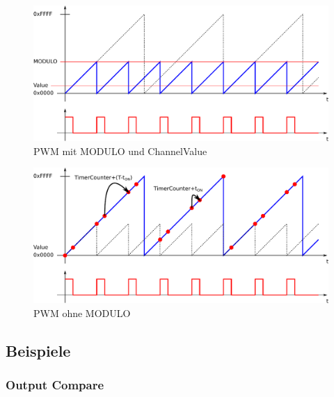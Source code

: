 \begin{figure}[h!]
	\centering
	\includegraphics[width=1\textwidth]{../fig/pwm_01.pdf}
	\caption{PWM mit MODULO und ChannelValue}
\end{figure}

\begin{figure}[h!]
	\centering
	\includegraphics[width=1\textwidth]{../fig/pwm_02.pdf}
	\caption{PWM ohne MODULO}
\end{figure}

\newpage
\subsection{Beispiele}

\subsubsection{Output Compare}


